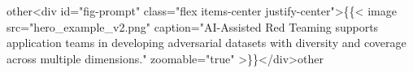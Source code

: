other<div id="fig-prompt" class="flex items-center justify-center">\{\{< image src="hero_example_v2.png" caption="AI-Assisted Red Teaming supports application teams in developing adversarial datasets with diversity and coverage across multiple dimensions." zoomable="true" >\}\}</div>other